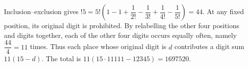 Inclusion--exclusion gives $!5=5!\left(1-1+\dfrac{1}{2!}-\dfrac{1}{3!}+\dfrac{1}{4!}-\dfrac{1}{5!}\right)=44$. At any fixed position, its original digit is prohibited. By relabelling the other four positions and digits together, each of the other four digits occurs equally often, namely $\dfrac{44}{4}=11$ times. Thus each place whose original digit is $d$ contributes a digit sum $11(15-d)$. The total is $11(15\cdot11111-12345)=\boxed{1697520}$.
